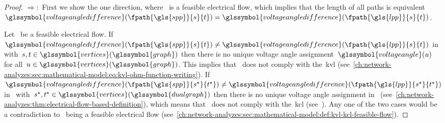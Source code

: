 % 
\begin{proof}
    $\Rightarrow\colon$ 
    First we show the one direction, where~ is a feasible
    electrical flow, which implies that the length of all paths is equivalent~$
        \glssymbol{voltageangledifference}(\fpath{\gls{spp}}{\source}{\sink})
        =
        \glssymbol{voltageangledifference}(\fpath{\gls{lpp}}{\source}{\sink})
    $.

    Let~ be a feasible electrical flow. 
    If~$
        \glssymbol{voltageangledifference}(\fpath{\gls{spp}}{\source}{\sink}) 
        \neq
        \glssymbol{voltageangledifference}(\fpath{\gls{lpp}}{\source}{\sink}) 
    $ in~ with~$
    \source,
    \sink
    \in
    \glssymbol{vertices}(\glssymbol{graph})
    $ then there is no unique voltage angle
    assignment~$\glssymbol{voltageangle}(\vertexa)$ for all~$\vertexa\in
    \glssymbol{vertices}(\glssymbol{graph})$. This implies that~
    does not comply with the~\gls{kvl}
    (see~\cref{ch:network-analyzes:sec:mathematical-model:eq:kvl-ohm-function-writing}).
    If~$
        \glssymbol{voltageangledifference}(\fpath{\gls{spp}}{\source^\star}
        {\sink^\star})
        \neq
        \glssymbol{voltageangledifference}(\fpath{\gls{lpp}}{\source^\star}{\sink^\star})
    $ in~ with~$
    \source^\star,
    \sink^\star
    \in
    \glssymbol{vertices}(\glssymbol{dualgraph})
    $ then there is no unique voltage angle assignment in~ 
    (see~\cref{ch:network-analyzes:thm:electrical-flow-based-definition}), 
    which means that~ does not comply with the~\gls{kcl}
    (see~).
    Any one of the two cases would be a contradiction to~ being
    a feasible electrical flow
    (see~\cref{ch:network-analyzes:sec:mathematical-model:def:kvl-kcl-feasible-flow}).


\end{proof}
